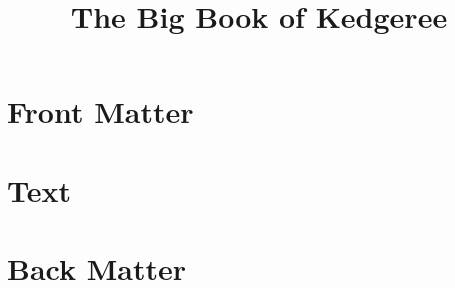 \documentclass[11pt]{book}
\title{The Big Book of Kedgeree}
\author{}
\begin{document}
\maketitle
\def\title#1{\chapter{#1}}
\tableofcontents

\part{Front Matter}
        
        
\part{Text}
        
        
\part{Back Matter}
        
        
\end{document}
